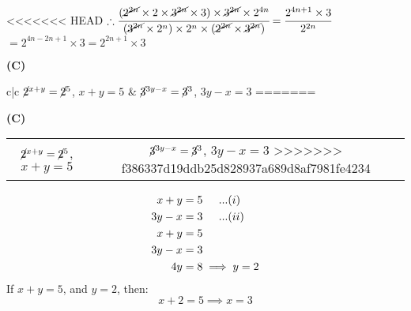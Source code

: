 \begin{multicols}{2}
\begin{enumerate}[label={\arabic*.}]
<<<<<<< HEAD
    $\therefore \cfrac{(\cancel{2^{2n}} \times 2 \times \cancel{3^{2n}} \times 3) \times \cancel{3^{2n}} \times 2^{4n}}{(\cancel{3^{2n}} \times 2^{n}) \times 2^{n} \times (\cancel{2^{2n}} \times \cancel{3^{2n}})}  = \cfrac{2^{4n + 1} \times 3}{2^{2n}}$\\
     $= 2^{4n - 2n + 1} \times 3  = 2^{2n + 1} \times 3$
    \item \textbf{(C)} \begin{tabular}{c|c}
        $\cancel{2}^{x+y} = \cancel{2}^5$, $x+y = 5$ & $\cancel{3}^{3y - x} = \cancel{3}^3$, $3y -x  = 3$
=======
    \item \textbf{(C)}
    \begin{tabular}{c|c}
        $\cancel{2}^{x+y} = \cancel{2}^5$, $x + y = 5$ & $\cancel{3}^{3y - x} = \cancel{3}^3$, $3y - x = 3$
>>>>>>> f386337d19ddb25d828937a689d8af7981fe4234
    \end{tabular}
    \begin{align*}
        x + y &= 5 \hspace{.2in} ...(i) \\
        3y - x &= 3 \hspace{.2in} ...(ii) \\
        x + y &= 5 \\
        3y - x &= 3 \\
        4y &= 8 \implies y = 2
    \end{align*}
    If \( x + y = 5 \), and \( y = 2 \), then:    
    \[x + 2 = 5 \implies x = 3 \]
    \item 
    \item
    \item
    \item 
    \item 
    \item 
    \item 
    \item
    \item
    \item
    \item 
    \item
    \item
    \item 
    \item 
    \item 
    \item 
    \item
    \item
    \item
    \item 

\end{tabular}
\end{enumerate}
\end{multicols}

